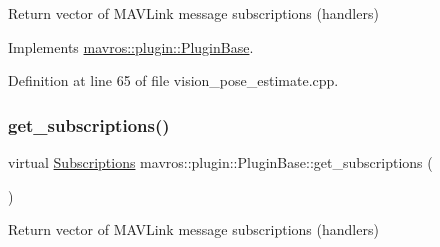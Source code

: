 Return vector of M\+A\+V\+Link message subscriptions (handlers) 



Implements \mbox{\hyperlink{group__plugin_gaf4e23fec6d7436a62cbf0942a2e5791c}{mavros\+::plugin\+::\+Plugin\+Base}}.



Definition at line 65 of file vision\+\_\+pose\+\_\+estimate.\+cpp.

\mbox{\label{group__plugin_gaf4e23fec6d7436a62cbf0942a2e5791c}} 
\subsubsection{\texorpdfstring{get\_subscriptions()}{get\_subscriptions()}\hspace{0.1cm}{\footnotesize\ttfamily [27/41]}}
{\footnotesize\ttfamily virtual \mbox{\hyperlink{group__plugin_ga8967d61fc77040e0c3ea5a4585d62a09}{Subscriptions}} mavros\+::plugin\+::\+Plugin\+Base\+::get\+\_\+subscriptions (\begin{DoxyParamCaption}{ }\end{DoxyParamCaption})\hspace{0.3cm}{\ttfamily [pure virtual]}}



Return vector of M\+A\+V\+Link message subscriptions (handlers) 



